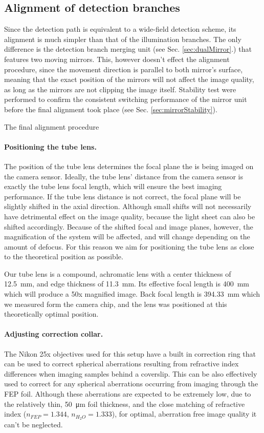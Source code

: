   \subsection{Alignment of detection branches}
    Since the detection path is equivalent to a wide-field detection scheme, its alignment is much simpler than that of the illumination branches. The only difference is the detection branch merging unit (see Sec. \ref{sec:dualMirror}.) that features two moving mirrors. This, however doesn't effect the alignment procedure, since the movement direction is parallel to both mirror's surface, meaning that the exact position of the mirrors will not affect the image quality, as long as the mirrors are not clipping the image itself. Stability test were performed to confirm the consistent switching performance of the mirror unit before the final alignment took place (see Sec. \ref{sec:mirrorStability}).

    The final alignment procedure 

    \paragraph{Positioning the tube lens.}
      The position of the tube lens determines the focal plane the is being imaged on the camera sensor. Ideally, the tube lens' distance from the camera sensor is exactly the tube lens focal length, which will ensure the best imaging performance. If the tube lens distance is not correct, the focal plane will be slightly shifted in the axial direction. Although small shifts will not necessarily have detrimental effect on the image quality, because the light sheet can also be shifted accordingly. Because of the shifted focal and image planes, however, the magnification of the system will be affected, and will change depending on the amount of defocus. For this reason we aim for positioning the tube lens as close to the theoretical position as possible.

      Our tube lens is a compound, achromatic lens with a center thickness of \SI{12.5}{mm}, and edge thickness of \SI{11.3}{mm}. Its effective focal length is \SI{400}{mm} which will produce a 50x magnified image. Back focal length is \SI{394.33}{mm} which we measured form the camera chip, and the lens was positioned at this theoretically optimal position.

    \paragraph{Adjusting correction collar.}
      The Nikon 25x objectives used for this setup have a built in correction ring that can be used to correct spherical aberrations resulting from refractive index differences when imaging samples behind a coverslip. This can be also effectively used to correct for any spherical aberrations occurring from imaging through the FEP foil. Although these aberrations are expected to be extremely low, due to the relatively thin, \SI{50}{\micro m} foil thickness, and the close matching of refractive index ($n_{FEP} = 1.344$, $n_{H_2O}=1.333$), for optimal, aberration free image quality it can't be neglected.


